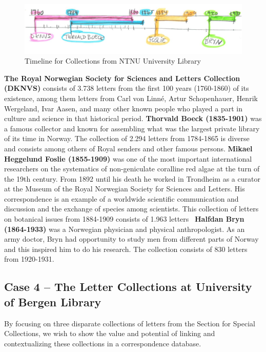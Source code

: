\documentclass[runningheads]{llncs}
\begin{document}
\begin{figure}[h!]
\centering
\includegraphics[width=\textwidth]{NTNU_case_sketch.png}
\caption{Timeline for Collections from NTNU University Library} \label{fig6}
\end{figure}

\textbf{The Royal Norwegian Society for Sciences and Letters Collection (DKNVS)} consists of 3.738 letters from the first 100 years (1760-1860) of its existence, among them letters from Carl von Linné, Artur Schopenhauer, Henrik Wergeland, Ivar Aasen, and many other known people who played a part in culture and science in that historical period.
\textbf{Thorvald Boeck (1835-1901)} was a famous collector and known for assembling what was the largest private library of its time in Norway. The collection of 2.294 letters from 1784-1865 is diverse and consists among others of Royal senders and other famous persons. 
\textbf{Mikael Heggelund Foslie (1855-1909)} was one of the most important international researchers on the systematics of non-geniculate coralline red algae at the turn of the 19th century. From 1892 until his death he worked in Trondheim as a curator at the Museum of the Royal Norwegian Society for Sciences and Letters. His correspondence is an example of a worldwide scientific communication and discussion and the exchange of species among scientists. This  collection of letters on botanical issues from 1884-1909 consists of 1.963 letters~\cite{ref_algae}
\textbf{Halfdan Bryn (1864-1933)} was a Norwegian physician and physical anthropologist. As an army doctor, Bryn had opportunity to study men from different parts of Norway and this inspired him to do his research. The collection consists of 830 letters from 1920-1931.~\cite{ref_halfdan}

\subsection{Case 4 -- The Letter Collections at University of Bergen Library}
By focusing on three disparate collections of letters from the Section
for Special Collections, we wish to show the value and potential of
linking and contextualizing these collections in a correspondence
database.
\end{document}
